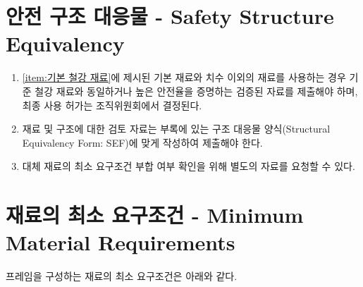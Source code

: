 \documentclass[final,a4paper,10pt]{report}
\begin{document}
\section{안전 구조 대응물 - Safety Structure Equivalency}\label{rule:formula-technical.structural-equivalency} \label{section:안전 구조 대응물}
\begin{enumerate}
  \item\label{rule:formula-technical.structural-equivalency.alt-material-approval} \ref{item:기본 철강 재료}에 제시된 기본 재료와 치수 이외의 재료를 사용하는 경우 기준 철강 재료와 동일하거나 높은 안전율을 증명하는 검증된 자료를 제출해야 하며, 최종 사용 허가는 조직위원회에서 결정된다.
  \item\label{rule:formula-technical.structural-equivalency.sef-form-submission} 재료 및 구조에 대한 검토 자료는 부록에 있는 구조 대응물 양식(Structural Equivalency Form: SEF)에 맞게 작성하여 제출해야 한다.
  \item\label{rule:formula-technical.structural-equivalency.additional-data-request} 대체 재료의 최소 요구조건 부합 여부 확인을 위해 별도의 자료를 요청할 수 있다.
\end{enumerate}

\section{재료의 최소 요구조건 - Minimum Material Requirements}\label{rule:formula-technical.minimum-material} \label{section:재료의 최소 요구조건}
프레임을 구성하는 재료의 최소 요구조건은 아래와 같다.
\end{document}
